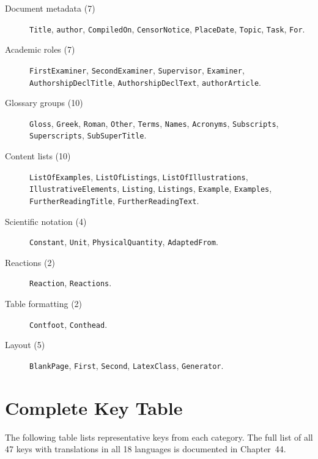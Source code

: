 \begin{description}
  \item[Document metadata (7)] \texttt{Title}, \texttt{author},
    \texttt{CompiledOn}, \texttt{CensorNotice}, \texttt{PlaceDate},
    \texttt{Topic}, \texttt{Task}, \texttt{For}.
  \item[Academic roles (7)] \texttt{FirstExaminer},
    \texttt{SecondExaminer}, \texttt{Supervisor}, \texttt{Examiner},
    \texttt{AuthorshipDeclTitle}, \texttt{AuthorshipDeclText},
    \texttt{authorArticle}.
  \item[Glossary groups (10)] \texttt{Gloss}, \texttt{Greek},
    \texttt{Roman}, \texttt{Other}, \texttt{Terms}, \texttt{Names},
    \texttt{Acronyms}, \texttt{Subscripts}, \texttt{Superscripts},
    \texttt{SubSuperTitle}.
  \item[Content lists (10)] \texttt{ListOfExamples},
    \texttt{ListOfListings}, \texttt{ListOfIllustrations},
    \texttt{IllustrativeElements}, \texttt{Listing}, \texttt{Listings},
    \texttt{Example}, \texttt{Examples}, \texttt{FurtherReadingTitle},
    \texttt{FurtherReadingText}.
  \item[Scientific notation (4)] \texttt{Constant}, \texttt{Unit},
    \texttt{PhysicalQuantity}, \texttt{AdaptedFrom}.
  \item[Reactions (2)] \texttt{Reaction}, \texttt{Reactions}.
  \item[Table formatting (2)] \texttt{Contfoot}, \texttt{Conthead}.
  \item[Layout (5)] \texttt{BlankPage}, \texttt{First}, \texttt{Second},
    \texttt{LatexClass}, \texttt{Generator}.
\end{description}

\section{Complete Key Table}

The following table lists representative keys from each category.
The full list of all 47 keys with translations in all 18 languages is
documented in Chapter~44.

